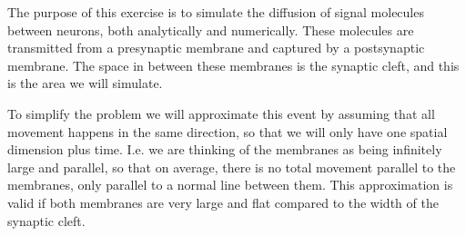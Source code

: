 The purpose of this exercise is to simulate the diffusion of signal
molecules between neurons, both analytically and numerically. These
molecules are transmitted from a presynaptic membrane and captured
by a postsynaptic membrane. The space in between these membranes is
the synaptic cleft, and this is the area we will simulate.

To simplify the problem we will approximate this event by assuming
that all movement happens in the same direction, so that we will
only have one spatial dimension plus time. I.e. we are thinking of
the membranes as being infinitely large and parallel, so that on
average, there is no total movement parallel to the membranes, only
parallel to a normal line between them. This approximation is valid
if both membranes are very large and flat compared to the width of
the synaptic cleft.
